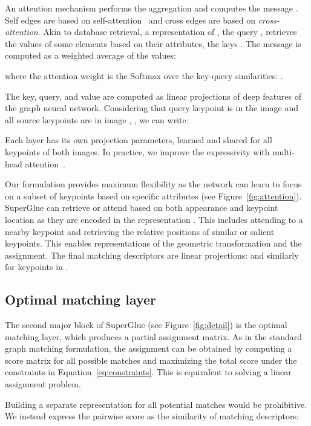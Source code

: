 \documentclass[10pt,twocolumn,letterpaper]{article}
\newcommand{\PAR}[1]{\vskip4pt \noindent{\bf #1~}}
\renewcommand{\*}[1]{\mathbf{#1}}
\newcommand{\0}{\phantom{0}}
\begin{document}
\PAR{Attentional Aggregation:}
An attention mechanism performs the aggregation and computes the message . Self edges are based on self-attention~\cite{vaswani2017attention} and cross edges are based on \emph{cross-attention}. Akin to database retrieval, a representation of , the query , retrieves the values  of some elements based on their attributes, the keys . The message is computed as a weighted average of the values:
    
    where the attention weight  is the Softmax over the key-query similarities: .

The key, query, and value are computed as linear projections of deep features of the graph neural network. Considering that query keypoint  is in the image  and all source keypoints are in image , , we can write:
    
Each layer  has its own projection parameters, learned and shared for all keypoints of both images. In practice, we improve the expressivity with multi-head attention~\cite{vaswani2017attention}.

Our formulation provides maximum flexibility as the network can learn to focus on a subset of keypoints based on specific attributes (see Figure~\ref{fig:attention}). SuperGlue can retrieve or attend based on both appearance and keypoint location as they are encoded in the representation . This includes attending to a nearby keypoint and retrieving the relative positions of similar or salient keypoints. This enables representations of the geometric transformation and the assignment. The final matching descriptors are linear projections: 
and similarly for keypoints in .
 
\subsection{Optimal matching layer}
\label{sec:optimal}
The second major block of SuperGlue (see Figure~\ref{fig:detail}) is the optimal matching layer, which produces a partial assignment matrix. As in the standard graph matching formulation, the assignment  can be obtained by computing a score matrix  for all possible matches and maximizing the total score  under the constraints in Equation~\ref{eq:constraints}. This is equivalent to solving a linear assignment problem.

\PAR{Score Prediction:}
Building a separate representation for all  potential matches would be prohibitive. We instead express the pairwise score as the similarity of matching descriptors:
\end{document}
